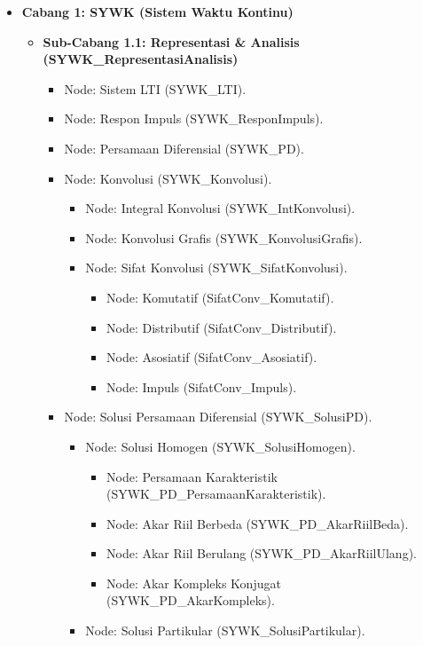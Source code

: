 \documentclass[
  letterpaper,
  DIV=11,
  numbers=noendperiod]{scrreprt}
\providecommand{\tightlist}{%
  \setlength{\itemsep}{0pt}\setlength{\parskip}{0pt}}
\begin{document}
\begin{itemize}
\tightlist
\item
  \textbf{Cabang 1: SYWK (Sistem Waktu Kontinu)}

  \begin{itemize}
  \tightlist
  \item
    \textbf{Sub-Cabang 1.1: Representasi \& Analisis
    (SYWK\_RepresentasiAnalisis)}

    \begin{itemize}
    \tightlist
    \item
      Node: Sistem LTI (SYWK\_LTI).
    \item
      Node: Respon Impuls (SYWK\_ResponImpuls).
    \item
      Node: Persamaan Diferensial (SYWK\_PD).
    \item
      Node: Konvolusi (SYWK\_Konvolusi).

      \begin{itemize}
      \tightlist
      \item
        Node: Integral Konvolusi (SYWK\_IntKonvolusi).
      \item
        Node: Konvolusi Grafis (SYWK\_KonvolusiGrafis).
      \item
        Node: Sifat Konvolusi (SYWK\_SifatKonvolusi).

        \begin{itemize}
        \tightlist
        \item
          Node: Komutatif (SifatConv\_Komutatif).
        \item
          Node: Distributif (SifatConv\_Distributif).
        \item
          Node: Asosiatif (SifatConv\_Asosiatif).
        \item
          Node: Impuls (SifatConv\_Impuls).
        \end{itemize}
      \end{itemize}
    \item
      Node: Solusi Persamaan Diferensial (SYWK\_SolusiPD).

      \begin{itemize}
      \tightlist
      \item
        Node: Solusi Homogen (SYWK\_SolusiHomogen).

        \begin{itemize}
        \tightlist
        \item
          Node: Persamaan Karakteristik
          (SYWK\_PD\_PersamaanKarakteristik).
        \item
          Node: Akar Riil Berbeda (SYWK\_PD\_AkarRiilBeda).
        \item
          Node: Akar Riil Berulang (SYWK\_PD\_AkarRiilUlang).
        \item
          Node: Akar Kompleks Konjugat (SYWK\_PD\_AkarKompleks).
        \end{itemize}
      \item
        Node: Solusi Partikular (SYWK\_SolusiPartikular).


\end{itemize}
\end{itemize}
\end{itemize}
\end{itemize}
\end{document}
